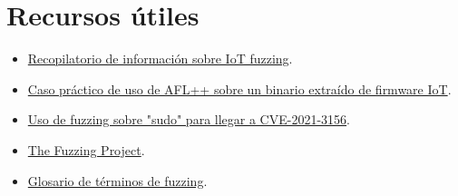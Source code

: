 \documentclass[11pt, a4paper, openany]{report}
\begin{document}
    \section{Recursos útiles}
    \begin{itemize}
        \item \href{https://github.com/andreia-oca/awesome-embedded-fuzzing}{Recopilatorio de información sobre
         IoT fuzzing}.
        \item \href{https://blog.attify.com/fuzzing-iot-devices-part-1/}{Caso práctico de uso de AFL++ sobre un 
        binario extraído de firmware IoT}.
         \item \href{https://www.youtube.com/playlist?list=PLhixgUqwRTjy0gMuT4C3bmjeZjuNQyqdx}{Uso de fuzzing sobre
        "sudo" para llegar a CVE-2021-3156}.
        \item \href{https://fuzzing-project.org/tutorials.html}{The Fuzzing Project}.
        \item \href{https://github.com/google/fuzzing/blob/master/docs/glossary.md}{Glosario de términos de fuzzing}.

    \end{itemize}
    
\end{document}
